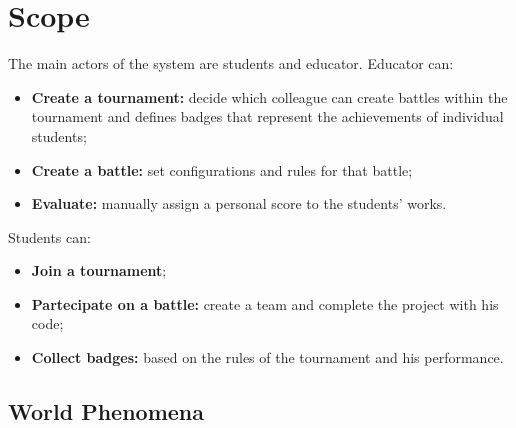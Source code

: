 \section{Scope}
The main actors of the system are students and educator. Educator can:
\begin{itemize}
    \item \textbf{Create a tournament:} decide which colleague can create battles within the tournament and defines badges 
    that represent the achievements of individual students; 
    \item \textbf{Create a battle:} set configurations and rules for that battle;
    \item \textbf{Evaluate:} manually assign a personal score to the students' works.
\end{itemize}

Students can:
\begin{itemize}
    \item \textbf{Join a tournament};
    \item \textbf{Partecipate on a battle:} create a team and complete the project with his code;
    \item \textbf{Collect badges:} based on the rules of the tournament and his performance.
\end{itemize}

\subsection{World Phenomena}

\begin{table}[H]
    \end{table}
    \clearpage

